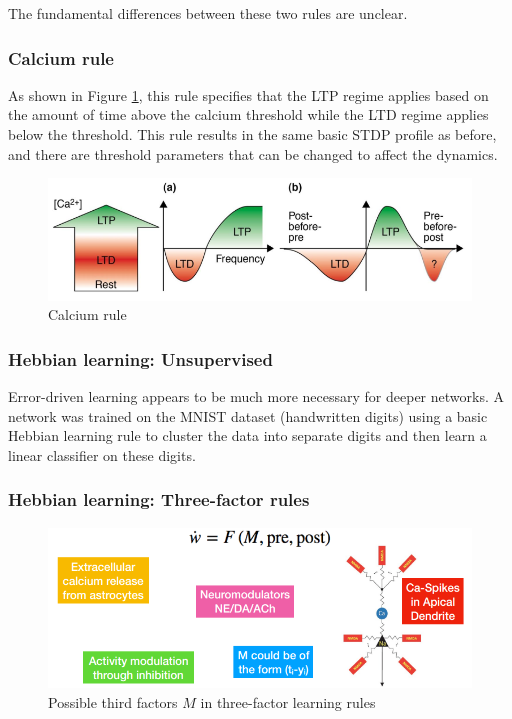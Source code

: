 \documentclass[main]{subfiles}
\begin{document}
The fundamental differences between these two rules are unclear.

\subsubsection{Calcium rule}

As shown in Figure \ref{fig:4_calcium}, this rule specifies that the LTP regime applies based on the amount of time above the calcium threshold while the LTD regime applies below the threshold. This rule results in the same basic STDP profile as before, and there are threshold parameters that can be changed to affect the dynamics.

\begin{figure}[H]
		\centering
		\includegraphics[width=0.8\linewidth]{04_LearningRules/figures/4_5_calcium.png}
		\caption{Calcium rule}
		\label{fig:4_calcium}
	\end{figure}

\subsubsection{Hebbian learning: Unsupervised}

Error-driven learning appears to be much more necessary for deeper networks. A network was trained on the MNIST dataset (handwritten digits) using a basic Hebbian learning rule to cluster the data into separate digits and then learn a linear classifier on these digits.

\subsubsection{Hebbian learning: Three-factor rules}

\begin{figure}[H]
		\centering
		\includegraphics[width=1.0\linewidth]{04_LearningRules/figures/4_6_three-factor.png}
		\caption{Possible third factors $M$ in three-factor learning rules}
		\label{fig:4_threefactor}
	\end{figure}
\end{document}
